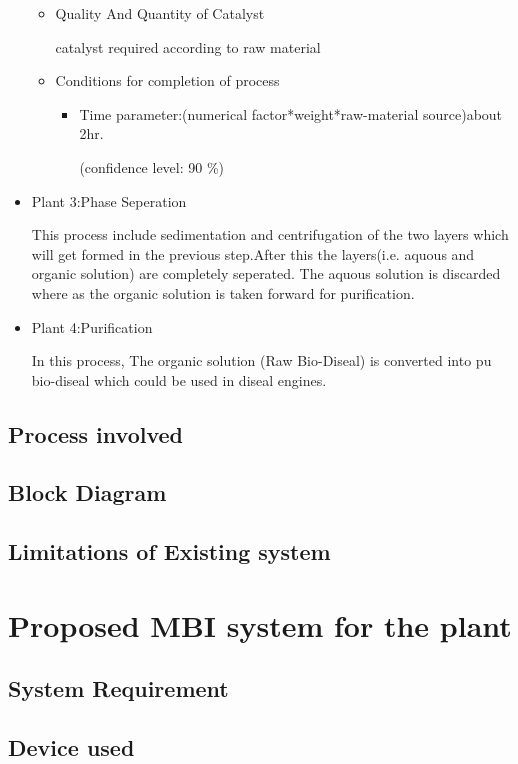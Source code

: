 \documentclass[12pt]{article}
\begin{document}
\begin{itemize}
\begin{itemize}
\item Quality And Quantity of Catalyst\par
catalyst required according to raw material 
\item Conditions for completion of process\par
\begin{itemize}
\item Time parameter:(numerical factor*weight*raw-material source)about 2hr.\par
(confidence level: 90 \%) 
\end{itemize}
\end{itemize}
\item Plant 3:Phase Seperation\par
This process include sedimentation and centrifugation of the two layers which will get formed in the previous step.After this the layers(i.e. aquous and organic solution) are completely seperated. The aquous solution is discarded where as the organic solution is taken forward for purification.

\item Plant 4:Purification\par
In this process, The organic solution (Raw Bio-Diseal) is converted into pu bio-diseal which could be used in diseal engines.


\end {itemize}
\subsection{Process involved}
\subsection{Block Diagram}
\subsection{Limitations of Existing system}
\newpage
\section{Proposed MBI system for the plant}
\subsection{System Requirement}
\subsection{Device used}
\end{document}
